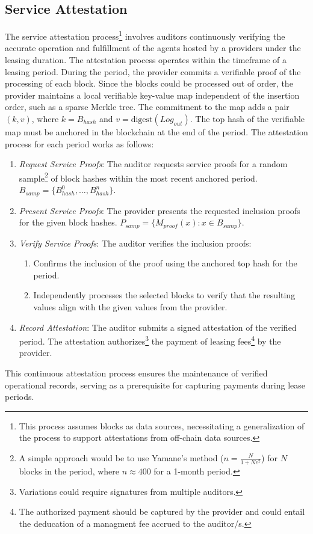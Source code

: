 \documentclass{oc}
\begin{document}
\subsection{Service Attestation}\label{sec:service-attestation}

The service attestation process\footnote{
  This process assumes blocks as data sources, necessitating a generalization of the process to support attestations from off-chain data sources.
} involves \glspl{auditor} continuously verifying the accurate operation and fulfillment of the agents hosted by a \glspl{provider} under the leasing duration.
The attestation process operates within the timeframe of a leasing period.
During the period, the provider commits a verifiable proof of the processing of each block.
Since the blocks could be processed out of order, the \gls{provider} maintains a local verifiable key-value map independent of the insertion order, such as a sparse Merkle tree\cite{cryptoeprint:2016/683}.
The commitment to the map adds a pair $(k, v)$, where $k=B_{hash}$ and $v=\text{digest}(Log_{out})$.
The top hash of the verifiable map must be anchored in the blockchain at the end of the period.
The attestation process for each period works as follows:

\begin{enumerate}
  \item \emph{Request Service Proofs}: The \gls{auditor} requests service proofs for a random sample\footnote{
    A simple approach would be to use Yamane's method ($n=\frac{N}{1+Ne^2}$) for $N$ blocks in the period, where $n\approx400$ for a 1-month period.
  } of block hashes within the most recent anchored period. $B_{samp}=\{B_{hash}^0,\ldots,B_{hash}^n\}$.
  
  \item \emph{Present Service Proofs}: The \gls{provider} presents the requested inclusion proofs for the given block hashes. $P_{samp}=\{M_{proof}(x) : x \in B_{samp}\}$.
  
  \item \emph{Verify Service Proofs}: The \gls{auditor} verifies the inclusion proofs:
    \begin{enumerate}
      \item Confirms the inclusion of the proof using the anchored top hash for the period.
      \item Independently processes the selected blocks to verify that the resulting values align with the given values from the provider.
    \end{enumerate}
  
  \item \emph{Record Attestation}: The \gls{auditor} submits a signed attestation of the verified period. The attestation authorizes\footnote{
    Variations could require signatures from multiple auditors.
  } the payment of leasing fees\footnote{
    The authorized payment should be captured by the \gls{provider} and could entail the deducation of a managment fee accrued to the \gls{auditor}/s.
  } by the \gls{provider}.
\end{enumerate}

This continuous attestation process ensures the maintenance of verified operational records, serving as a prerequisite for capturing payments during lease periods.


\clearpage

\printglossary


\end{document}
